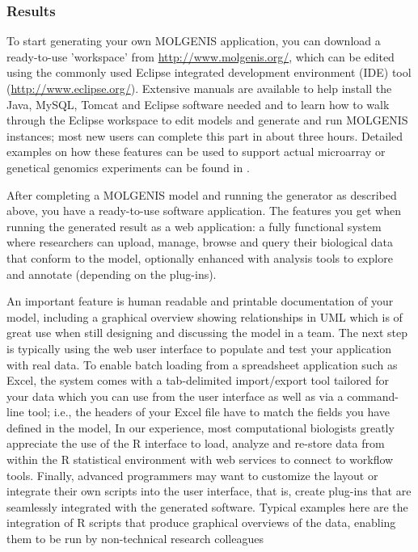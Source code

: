 \subsubsection{Results}
To start generating your own MOLGENIS application, you can download a ready-to-use 'workspace' 
from \url{http://www.molgenis.org/}, which can be edited using the commonly used Eclipse integrated 
development environment (IDE) tool (\url{http://www.eclipse.org/}). Extensive manuals are available to 
help install the Java, MySQL, Tomcat and Eclipse software needed and to learn how to walk through 
the Eclipse workspace to edit models and generate and run MOLGENIS instances; most new users can 
complete this part in about three hours. Detailed examples on how these features can be 
used to support actual microarray or genetical genomics experiments can be found in \cite{Swertz:2010a, Li:2009, Smedley:2008}.

After completing a MOLGENIS model and running the generator as described above, you have a 
ready-to-use software application. The features you get when running the generated result as 
a web application: a fully functional system where researchers can upload, manage, browse 
and query their biological data that conform to the model, optionally enhanced with analysis 
tools to explore and annotate (depending on the plug-ins).

An important feature is human readable and printable documentation of your model, including a graphical 
overview showing relationships in UML which is of great use when still designing and discussing the model 
in a team. The next step is typically using the web user interface to populate and test your application 
with real data. To enable batch loading from a spreadsheet application such as Excel, the system comes with 
a tab-delimited import/export tool tailored for your data which you can use from the user interface as well 
as via a command-line tool; i.e., the headers of your Excel file have to match the fields you have defined 
in the model, In our experience, most computational biologists greatly appreciate the use of the R interface 
to load, analyze and re-store data from within the R statistical environment with web services to connect 
to workflow tools. Finally, advanced programmers may want to customize the layout or integrate their own 
scripts into the user interface, that is, create plug-ins that are seamlessly integrated with the generated 
software. Typical examples here are the integration of R scripts that produce graphical overviews of the data, 
enabling them to be run by non-technical research colleagues

